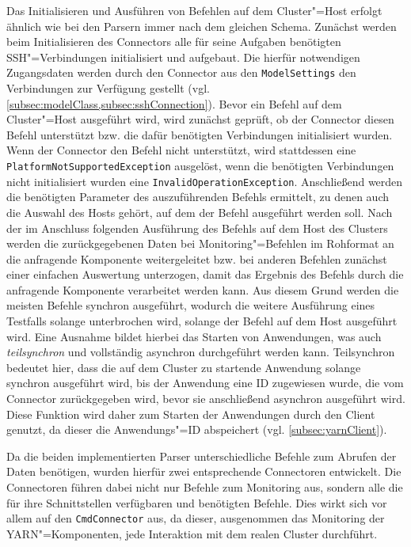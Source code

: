 Das Initialisieren und Ausführen von Befehlen auf dem Cluster"=Host erfolgt ähnlich wie bei den Parsern immer nach dem gleichen Schema.
Zunächst werden beim Initialisieren des Connectors alle für seine Aufgaben benötigten SSH"=Verbindungen initialisiert und aufgebaut.
Die hierfür notwendigen Zugangsdaten werden durch den Connector aus den \texttt{ModelSettings} den Verbindungen zur Verfügung gestellt (vgl. \cref{subsec:modelClass,subsec:sshConnection}).
Bevor ein Befehl auf dem Cluster"=Host ausgeführt wird, wird zunächst geprüft, ob der Connector diesen Befehl unterstützt bzw. die dafür benötigten Verbindungen initialisiert wurden.
Wenn der Connector den Befehl nicht unterstützt, wird stattdessen eine \texttt{PlatformNotSupportedException} ausgelöst, wenn die benötigten Verbindungen nicht initialisiert wurden eine \texttt{InvalidOperationException}.
Anschließend werden die benötigten Parameter des auszuführenden Befehls ermittelt, zu denen auch die Auswahl des Hosts gehört, auf dem der Befehl ausgeführt werden soll.
Nach der im Anschluss folgenden Ausführung des Befehls auf dem Host des Clusters werden die zurückgegebenen Daten bei Monitoring"=Befehlen im Rohformat an die anfragende Komponente weitergeleitet bzw. bei anderen Befehlen zunächst einer einfachen Auswertung unterzogen, damit das Ergebnis des Befehls durch die anfragende Komponente verarbeitet werden kann.
Aus diesem Grund werden die meisten Befehle synchron ausgeführt, wodurch die weitere Ausführung eines Testfalls solange unterbrochen wird, solange der Befehl auf dem Host ausgeführt wird.
Eine Ausnahme bildet hierbei das Starten von Anwendungen, was auch \emph{teilsynchron} und vollständig asynchron durchgeführt werden kann.
Teilsynchron bedeutet hier, dass die auf dem Cluster zu startende Anwendung solange synchron ausgeführt wird, bis der Anwendung eine ID zugewiesen wurde, die vom Connector zurückgegeben wird, bevor sie anschließend asynchron ausgeführt wird.
Diese Funktion wird daher zum Starten der Anwendungen durch den Client genutzt, da dieser die Anwendungs"=ID abspeichert (vgl. \cref{subsec:yarnClient}).

Da die beiden implementierten Parser unterschiedliche Befehle zum Abrufen der Daten benötigen, wurden hierfür zwei entsprechende Connectoren entwickelt.
Die Connectoren führen dabei nicht nur Befehle zum Monitoring aus, sondern alle die für ihre Schnittstellen verfügbaren und benötigten Befehle.
Dies wirkt sich vor allem auf den \texttt{CmdConnector} aus, da dieser, ausgenommen das Monitoring der YARN"=Komponenten, jede Interaktion mit dem realen Cluster durchführt.

